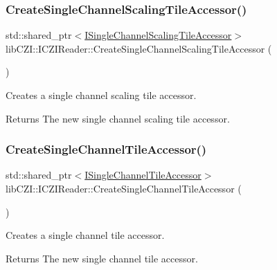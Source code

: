 \subsubsection{\texorpdfstring{Create\+Single\+Channel\+Scaling\+Tile\+Accessor()}{CreateSingleChannelScalingTileAccessor()}}
{\footnotesize\ttfamily std\+::shared\+\_\+ptr$<$\hyperlink{classlib_c_z_i_1_1_i_single_channel_scaling_tile_accessor}{I\+Single\+Channel\+Scaling\+Tile\+Accessor}$>$ lib\+C\+Z\+I\+::\+I\+C\+Z\+I\+Reader\+::\+Create\+Single\+Channel\+Scaling\+Tile\+Accessor (\begin{DoxyParamCaption}{ }\end{DoxyParamCaption})\hspace{0.3cm}{\ttfamily [inline]}}

Creates a single channel scaling tile accessor. \begin{DoxyReturn}{Returns}
The new single channel scaling tile accessor. 
\end{DoxyReturn}
\mbox{\label{classlib_c_z_i_1_1_i_c_z_i_reader_a41d07167b2005205fc15d6d64ec280b8}} 
\subsubsection{\texorpdfstring{Create\+Single\+Channel\+Tile\+Accessor()}{CreateSingleChannelTileAccessor()}}
{\footnotesize\ttfamily std\+::shared\+\_\+ptr$<$\hyperlink{classlib_c_z_i_1_1_i_single_channel_tile_accessor}{I\+Single\+Channel\+Tile\+Accessor}$>$ lib\+C\+Z\+I\+::\+I\+C\+Z\+I\+Reader\+::\+Create\+Single\+Channel\+Tile\+Accessor (\begin{DoxyParamCaption}{ }\end{DoxyParamCaption})\hspace{0.3cm}{\ttfamily [inline]}}

Creates a single channel tile accessor. \begin{DoxyReturn}{Returns}
The new single channel tile accessor. 
\end{DoxyReturn}
\mbox{\label{classlib_c_z_i_1_1_i_c_z_i_reader_aeae9420aefeed528808a566c4cfc11a2}} 
